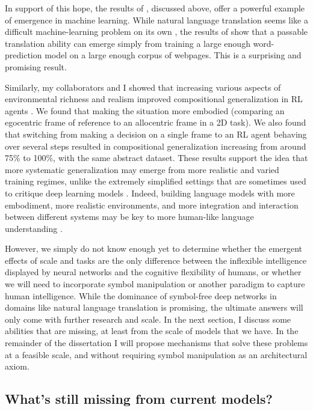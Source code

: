 In support of this hope, the results of \citet{Radford2019}, discussed above, offer a powerful example of emergence in machine learning. While natural language translation seems like a difficult machine-learning problem on its own \citep{Wu2016}, the results of \citet{Radford2019} show that a passable translation ability can emerge simply from training a large enough word-prediction model on a large enough corpus of webpages. This is a surprising and promising result. \par 
Similarly, my collaborators and I showed that increasing various aspects of environmental richness and realism improved compositional generalization in RL agents \citep{Hill2019a}. We found that making the situation more embodied (comparing an egocentric frame of reference to an allocentric frame in a 2D task). We also found that switching from making a decision on a single frame to an RL agent behaving over several steps resulted in compositional generalization increasing from around 75\% to 100\%, with the same abstract dataset. These results support the idea that more systematic generalization may emerge from more realistic and varied training regimes, unlike the extremely simplified settings that are sometimes used to critique deep learning models \citep[see e.g.][]{Lake2017}. Indeed, building language models with more embodiment, more realistic environments, and more integration and interaction between different systems may be key to more human-like language understanding \citep{McClelland2019}.\par
However, we simply do not know enough yet to determine whether the emergent effects of scale and tasks are the only difference between the inflexible intelligence displayed by neural networks and the cognitive flexibility of humans, or whether we will need to incorporate symbol manipulation or another paradigm to capture human intelligence. While the dominance of symbol-free deep networks in domains like natural language translation is promising, the ultimate answers will only come with further research and scale. In the next section, I discuss some abilities that are missing, at least from the scale of models that we have. In the remainder of the dissertation I will propose mechanisms that solve these problems at a feasible scale, and without requiring symbol manipulation as an architectural axiom. \par 

\subsection{What's still missing from current models?}

